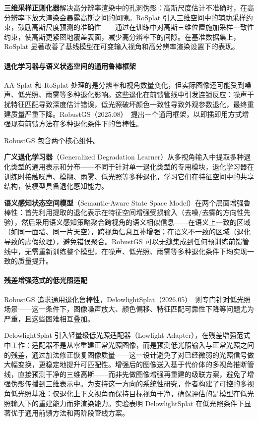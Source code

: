 \textbf{三维采样正则化器}解决高分辨率渲染中的孔洞伪影：高斯尺度估计不准确时，在高分辨率下放大渲染会暴露高斯之间的间隙。RoSplat 引入三维空间中的辅助采样约束，鼓励高斯尺度预测的准确性——通过在训练中对高斯三维位置施加采样一致性约束，使高斯更紧密地覆盖表面，减少高分辨率下的间隙。在基准数据集上，RoSplat 显著改善了基线模型在可变输入视角和高分辨率渲染设置下的表现。

\paragraph{退化学习器与语义状态空间的通用鲁棒框架}

AA-Splat 和 RoSplat 处理的是分辨率和视角数量变化，但实际图像还可能受到噪声、低光照、雨雾等多种退化影响。这些退化在前馈管线中引发连锁反应：噪声干扰特征匹配导致深度估计错误，低光照破坏颜色一致性导致外观参数退化，最终重建质量严重下降。RobustGS（2025.08）~\cite{2508_03077}提出一个通用框架，以即插即用方式增强现有前馈方法在多种退化条件下的鲁棒性。

RobustGS 包含两个核心组件。

\textbf{广义退化学习器}（Generalized Degradation Learner）从多视角输入中提取多种退化类型的通用表示和分布——不同于针对单一退化类型的专用模块，退化学习器在训练时接触噪声、模糊、雨雾、低光照等多种退化，学习它们在特征空间中的共享结构，使模型具备退化感知能力。

\textbf{语义感知状态空间模型}（Semantic-Aware State Space Model）在两个层面增强鲁棒性：首先利用提取的退化表示在特征空间增强受损输入（去噪/去雾的方向性先验），然后采用语义感知策略聚合跨视角的语义相似信息——在语义上一致的区域（如同一面墙、同一片天空），跨视角信息互补增强；在语义不一致的区域（退化导致的虚假纹理），避免错误聚合。RobustGS 可以无缝集成到任何预训练前馈管线中，无需重新训练整个模型，在噪声、低光照、雨雾等多种退化条件下均实现一致的质量提升。

\paragraph{残差增强范式的低光照适配}

RobustGS 追求通用退化鲁棒性，DelowlightSplat（2026.05）~\cite{2605_26629}则专门针对低光照场景——这一条件下，图像噪声放大、颜色偏移、特征匹配可靠性下降等问题尤为严重，且这些困难相互叠加。

DelowlightSplat 引入轻量级低光照适配器（Lowlight Adapter），在残差增强范式中工作：适配器不是从零重建正常光照图像，而是预测低光照输入与正常光照之间的残差，通过加法修正恢复图像质量——这一设计避免了对已经微弱的光照信号做大幅变换，更稳定地提升可匹配性。增强后的图像送入基于代价体的多视角推断管线，直接预测干净的三维高斯——而非先做图像增强再重建的级联方案，避免了增强伪影传播到三维表示中。为支持这一方向的系统性研究，作者构建了可控的多视角低光照基准：仅退化上下文视角而保持目标视角干净，确保评估的是模型在低光照输入下的重建能力而非渲染能力。实验表明 DelowlightSplat 在低光照条件下显著优于通用前馈方法和两阶段管线方案。

